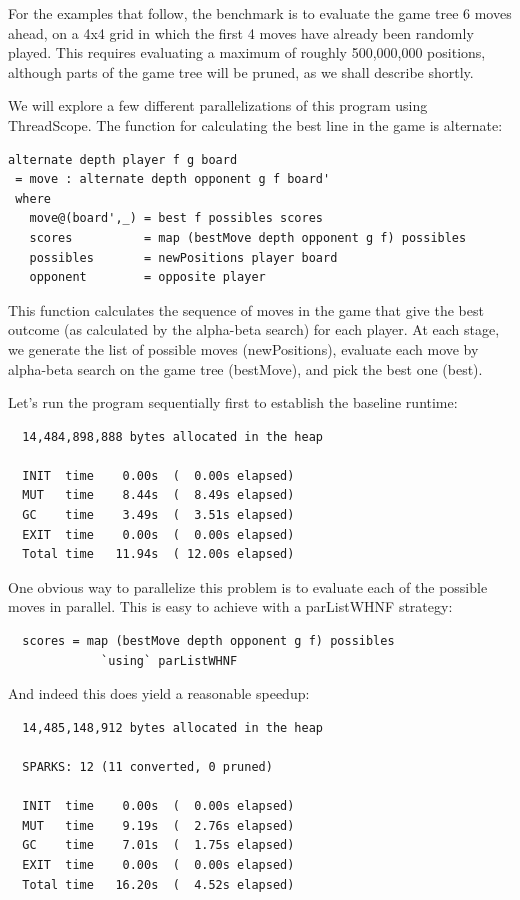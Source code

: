 \documentclass[twocolumn,9pt]{sigplanconf}
\newcommand{\codef}[1]{{\fontfamily{cmss}\small#1}}
\begin{document}
For the examples that follow, the benchmark is to evaluate the game
tree 6 moves ahead, on a 4x4 grid in which the first 4 moves have
already been randomly played.  This requires evaluating a maximum of
roughly 500,000,000 positions, although parts of the game tree will be
pruned, as we shall describe shortly.

We will explore a few different parallelizations of this program using
ThreadScope.  The function for calculating the best line in the game
is \codef{alternate}:

\begin{lstlisting}[columns=flexible]
alternate depth player f g board
 = move : alternate depth opponent g f board'
 where
   move@(board',_) = best f possibles scores
   scores          = map (bestMove depth opponent g f) possibles
   possibles       = newPositions player board
   opponent        = opposite player
\end{lstlisting}

This function calculates the sequence of moves in the game that give
the best outcome (as calculated by the alpha-beta search) for each
player.  At each stage, we generate the list of possible moves
(\codef{newPositions}), evaluate each move by alpha-beta search on the
game tree (\codef{bestMove}), and pick the best one (\codef{best}).

Let's run the program sequentially first to establish the baseline
runtime:

\begin{verbatim}
  14,484,898,888 bytes allocated in the heap

  INIT  time    0.00s  (  0.00s elapsed)
  MUT   time    8.44s  (  8.49s elapsed)
  GC    time    3.49s  (  3.51s elapsed)
  EXIT  time    0.00s  (  0.00s elapsed)
  Total time   11.94s  ( 12.00s elapsed)
\end{verbatim}

One obvious way to parallelize this problem is to evaluate each of the
possible moves in parallel.  This is easy to achieve with a
\codef{parListWHNF} strategy:

\begin{lstlisting}
  scores = map (bestMove depth opponent g f) possibles
             `using` parListWHNF
\end{lstlisting}

And indeed this does yield a reasonable speedup:

\begin{verbatim}
  14,485,148,912 bytes allocated in the heap

  SPARKS: 12 (11 converted, 0 pruned)

  INIT  time    0.00s  (  0.00s elapsed)
  MUT   time    9.19s  (  2.76s elapsed)
  GC    time    7.01s  (  1.75s elapsed)
  EXIT  time    0.00s  (  0.00s elapsed)
  Total time   16.20s  (  4.52s elapsed)
\end{verbatim}
\end{document}
